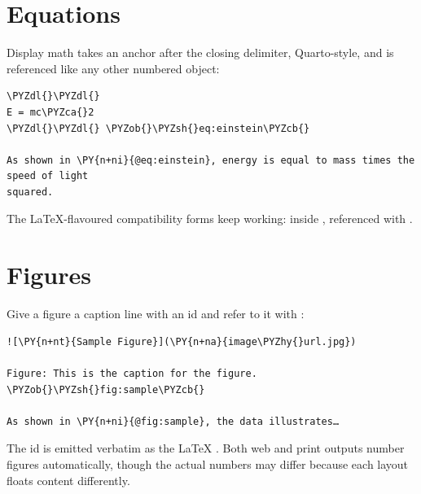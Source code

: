 \documentclass[a4paper,twoside]{article}
\begin{document}
\section{Equations}
Display math takes an anchor after the closing delimiter, Quarto-style, and is
referenced like any other numbered object:
\begin{tscode}[lang=md, engine=pygments]
\begin{Verbatim}[commandchars=\\\{\},breaklines, breakanywhere, commandchars=\\\{\}]
\PYZdl{}\PYZdl{}
E = mc\PYZca{}2
\PYZdl{}\PYZdl{} \PYZob{}\PYZsh{}eq:einstein\PYZcb{}

As shown in \PY{n+ni}{@eq:einstein}, energy is equal to mass times the speed of light
squared.
\end{Verbatim}
\end{tscode}
The \LaTeX{}-flavoured compatibility forms keep working:  inside \tscodeinline{\$\$}, referenced with .
\section{Figures}
Give a figure a caption line with an id and refer to it with :
\begin{tscode}[lang=md, engine=pygments]
\begin{Verbatim}[commandchars=\\\{\},breaklines, breakanywhere, commandchars=\\\{\}]
![\PY{n+nt}{Sample Figure}](\PY{n+na}{image\PYZhy{}url.jpg})

Figure: This is the caption for the figure. \PYZob{}\PYZsh{}fig:sample\PYZcb{}

As shown in \PY{n+ni}{@fig:sample}, the data illustrates…
\end{Verbatim}
\end{tscode}
The id is emitted verbatim as the \LaTeX{} . Both web and print outputs
number figures automatically, though the actual numbers may differ because each
layout floats content differently.
\end{document}
